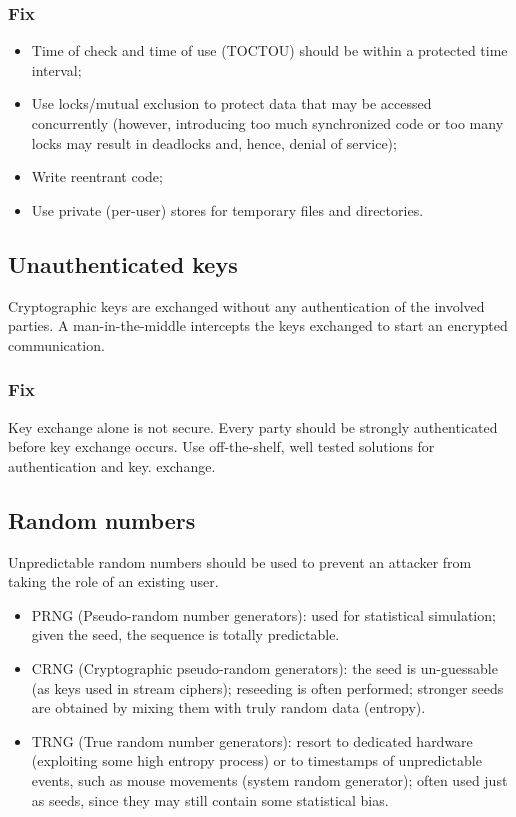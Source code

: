 \documentclass[a4paper, 10pt, titlepage]{article}
\begin{document}
\subsubsection*{Fix}
\begin{itemize}
\item Time of check and time of use (TOCTOU) should be within a
protected time interval;
\item Use locks/mutual exclusion to protect data that may be accessed
concurrently (however, introducing too much synchronized code or too
many locks may result in deadlocks and, hence, denial of service); 
\item Write reentrant code;
\item Use private (per-user) stores for temporary files and directories.
\end{itemize}


\subsection{Unauthenticated keys}
Cryptographic keys are exchanged without any authentication of the involved parties. A man-in-the-middle intercepts the keys exchanged to start an encrypted communication.

\subsubsection*{Fix}
Key exchange alone is not secure. Every party should be strongly authenticated before key exchange occurs. 
Use off-the-shelf, well tested solutions for authentication and key. exchange.


\subsection{Random numbers}
Unpredictable random numbers should be used to prevent an attacker from taking the role of an existing user.
\begin{itemize}
\item PRNG (Pseudo-random number generators): used for statistical simulation; given the seed, the sequence is totally predictable.
\item CRNG (Cryptographic pseudo-random generators): the seed is un-guessable (as keys used in stream ciphers); reseeding is often performed; stronger seeds are obtained by mixing them with truly random data (entropy).
\item TRNG (True random number generators): resort to dedicated hardware (exploiting some high entropy process) or to timestamps of unpredictable events, such as mouse movements (system random generator); often used just as seeds, since they may still contain some statistical bias.
\end{itemize}
\end{document}

